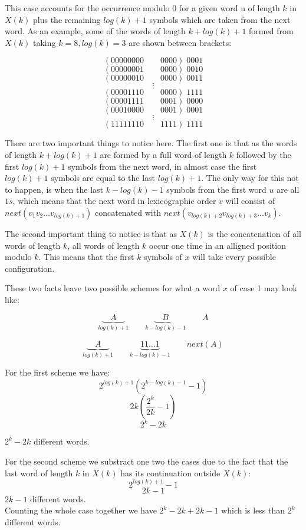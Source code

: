 \documentclass[10pt, a4paper]{article}
\theoremstyle{definition}
\begin{document}
This case accounts for the occurrence modulo 0 for a given word u of length $k$ in $X(k)$ plus the remaining $log(k) + 1$ symbols which are taken from the next word.
As an example, some of the words of length $k + log(k) + 1$ formed from $X(k)$ taking $k = 8, log(k) = 3$ are shown between brackets:

$$( 00000000 \qquad 0000 ) \; 0001$$
$$( 00000001 \qquad 0000 ) \; 0010$$
$$( 00000010 \qquad 0000 ) \; 0011$$
$$\vdots$$
$$( 00001110 \qquad 0000 ) \; 1111$$
$$( 00001111 \qquad 0001 ) \; 0000$$
$$( 00010000 \qquad 0001 ) \; 0001$$
$$\vdots$$
$$( 11111110 \qquad 1111 ) \; 1111$$

There are two important things to notice here. The first one is that as the words of length $k + log(k) + 1$ are formed by a full word of length $k$ followed by the first $log(k) + 1$ symbols from the next word, in almost case the first $log(k) + 1$ symbols are equal to the last $log(k) + 1$.
The only way for this not to happen, is when the last $k - log(k) - 1$ symbols from the first word $u$ are all $1s$, which means that the next word in lexicographic order $v$ will consist of $next(v_1 v_2 \dots v_{log(k) + 1})$ concatenated with $next(v_{log(k) + 2} v_{log(k) + 3} \dots v_{k})$.

The second important thing to notice is that as $X(k)$ is the concatenation of all words of length $k$, all words of length $k$ occur one time in an alligned position modulo $k$. This means that the first $k$ symbols of $x$ will take every possible configuration.

These two facts leave two possible schemes for what a word $x$ of case 1 may look like:

$$\underbrace{\quad A \quad }_{log(k) +1} \qquad \underbrace{\quad B \quad }_{k - log(k) - 1}  \qquad A$$


$$\underbrace{\quad A \quad }_{log(k) +1} \qquad \underbrace{ 11 \dots 1  }_{k - log(k) - 1}  \qquad next(A) $$

For the first scheme we have:
$$2^{log(k) + 1}  (2^{k - log(k) - 1} - 1)$$
$$ 2k  (\frac{2^k}{2k} - 1)$$
$$ 2^k - 2k$$

$ 2^k - 2k$ different words.

For the second scheme we substract one two the cases due to the fact that the last word of length $k$ in $X(k)$ has its continuation outside $X(k)$:
$$2^{log(k) + 1}   - 1$$
$$2k - 1$$
$ 2k - 1 $ different words.
\\

Counting the whole case together we have $ 2^k - 2k + 2k -1$ which is less than $2^k$ different words.
\end{document}
